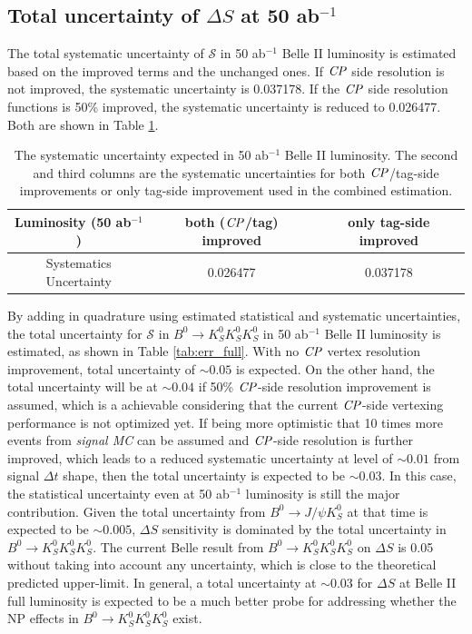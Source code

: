 \subsection{Total uncertainty of $\Delta S$ at 50 ab$^{-1}$}
The total systematic uncertainty of $\mathcal{S}$ in 50 ab$^{-1}$ Belle II luminosity is estimated based on the improved terms and the unchanged ones. If $\it{CP}$ side resolution is not improved, the systematic uncertainty is 0.037178. If the $\it{CP}$ side resolution functions is 50\% improved, the systematic uncertainty is reduced to  0.026477. Both are shown in Table \ref{tab:sys_full}. 

\begin{table}[htpb]
	\centering
	\caption{The systematic uncertainty expected in 50 ab$^{-1}$ Belle II luminosity. The second and third columns are the systematic uncertainties for both $\it{CP}$/tag-side improvements or only tag-side improvement used in the combined estimation.}
	\label{tab:sys_full}
	\begin{tabular}{c| c |c}
		\hline
		Luminosity (50 ab$^{-1}$) & both ($\it{CP}$/tag) improved & only tag-side improved\\
		\hline
		Systematics Uncertainty &  0.026477 & 0.037178\\
		\hline
	\end{tabular}
\end{table}


By adding in quadrature using estimated statistical and systematic uncertainties, the total uncertainty for $\mathcal{S}$ in $B^0 \to K_S^0  K_S^0  K_S^0$ in 50 ab$^{-1}$ Belle II luminosity is estimated, as shown in Table \ref{tab:err_full}. With no $\it{CP}$ vertex resolution improvement, total uncertainty of $\sim 0.05$ is expected.
On the other hand, the total uncertainty will be at $\sim 0.04$ if 50\% $\it{CP}$-side resolution improvement is assumed, which is a achievable considering that the current $\it{CP}$-side vertexing performance is not optimized yet. If being more optimistic that 10 times more events from \textit{signal MC} can be assumed and $\it{CP}$-side resolution is further improved, which leads to a reduced systematic uncertainty at level of $\sim 0.01$ from signal $\Delta t$ shape, then the total uncertainty is expected to be $\sim 0.03$. In this case, the statistical uncertainty even at 50 ab$^{-1}$ luminosity is still the major contribution. Given the total uncertainty from $B^0\to J/\psi K_S^0$ at that time is expected to be $\sim 0.005$\cite{b2book}, $\Delta S$ sensitivity is dominated by the total uncertainty in $B^0 \to K_S^0  K_S^0  K_S^0$. The current Belle result from $B^0 \to K_S^0  K_S^0  K_S^0$ on $\Delta S$ is 0.05 without taking into account any uncertainty, which is close to the theoretical predicted upper-limit. In general, a total uncertainty at $\sim 0.03$ for $\Delta S$ at Belle II full luminosity is expected to be a much better probe for addressing whether the NP effects in $B^0 \to K_S^0  K_S^0  K_S^0$ exist.

